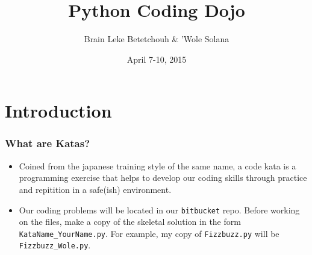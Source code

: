\documentclass[10pt,t,sans,mathsans,xcolor=dvipsnames]{beamer}
\title{ Python Coding Dojo }
\author{ Brain Leke Betetchouh \& 'Wole Solana }
\date{April 7-10, 2015}
\begin{document}
\frame [c, plain]{\titlepage}
\section{Introduction}
\begin{frame}
\frametitle{What are Katas?}
\begin{itemize}
\item Coined from the japanese training style of the same name, a \alert{code kata} is a programming exercise that helps to develop our coding skills through practice and repitition in a safe(ish) environment.
\item Our coding problems will be located in our \texttt{bitbucket} repo. Before working on the files, make a copy of the skeletal solution in the form \texttt{KataName\_YourName.py}. For example, my copy of \texttt{Fizzbuzz.py} will be \texttt{Fizzbuzz\_Wole.py}.
\end{itemize}
\end{frame}
\end{document}
